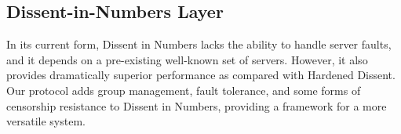 \subsection{Dissent-in-Numbers Layer}
In its current form, Dissent in Numbers lacks the ability to handle server
faults, and it depends on a pre-existing well-known set of servers. However, it
also provides dramatically superior performance as compared with Hardened
Dissent. Our protocol adds group management, fault tolerance, and some forms of
censorship resistance to Dissent in Numbers, providing a framework for a more
versatile system.


